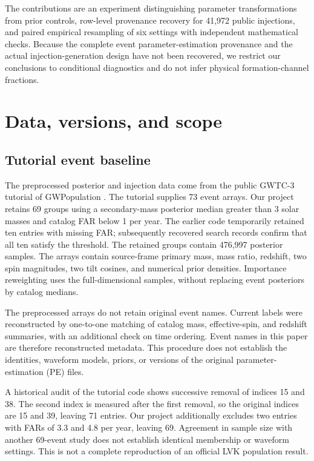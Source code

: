 \documentclass[a4paper,11pt]{article}
\begin{document}
The contributions are an experiment distinguishing parameter transformations from prior controls, row-level provenance recovery for 41,972 public injections, and paired empirical resampling of six settings with independent mathematical checks. Because the complete event parameter-estimation provenance and the actual injection-generation design have not been recovered, we restrict our conclusions to conditional diagnostics and do not infer physical formation-channel fractions.

\FloatBarrier
\section{Data, versions, and scope}\label{sec:2}
\subsection{Tutorial event baseline}\label{sec:2.1}
The preprocessed posterior and injection data come from the public GWTC-3 tutorial of GWPopulation \cite{ref7}. The tutorial supplies 73 event arrays. Our project retains 69 groups using a secondary-mass posterior median greater than 3 solar masses and catalog FAR below 1 per year. The earlier code temporarily retained ten entries with missing FAR; subsequently recovered search records confirm that all ten satisfy the threshold. The retained groups contain 476,997 posterior samples. The arrays contain source-frame primary mass, mass ratio, redshift, two spin magnitudes, two tilt cosines, and numerical prior densities. Importance reweighting uses the full-dimensional samples, without replacing event posteriors by catalog medians.

The preprocessed arrays do not retain original event names. Current labels were reconstructed by one-to-one matching of catalog mass, effective-spin, and redshift summaries, with an additional check on time ordering. Event names in this paper are therefore reconstructed metadata. This procedure does not establish the identities, waveform models, priors, or versions of the original parameter-estimation (PE) files.

A historical audit of the tutorial code shows successive removal of indices 15 and 38. The second index is measured after the first removal, so the original indices are 15 and 39, leaving 71 entries. Our project additionally excludes two entries with FARs of 3.3 and 4.8 per year, leaving 69. Agreement in sample size with another 69-event study does not establish identical membership or waveform settings. This is not a complete reproduction of an official LVK population result.
\end{document}
